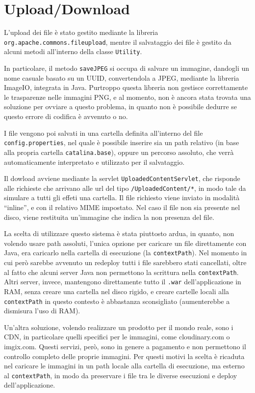 \chapter{Upload/Download}

L'upload dei file è stato gestito mediante la libreria \texttt{org.apache.commons.fileupload}, mentre il salvataggio dei file è gestito da alcuni metodi all'interno della classe \texttt{Utility}.

In particolare, il metodo \texttt{saveJPEG} si occupa di salvare un immagine, dandogli un nome casuale basato su un UUID, convertendola a JPEG, mediante la libreria ImageIO, integrata in Java.
Purtroppo questa libreria non gestisce correttamente le trasparenze nelle immagini PNG, e al momento, non è ancora stata trovata una soluzione per ovviare a questo problema, in quanto non è possibile dedurre se questo errore di codifica è avvenuto o no.

I file vengono poi salvati in una cartella definita all'interno del file \texttt{config.properties}, nel quale è possibile inserire sia un path relativo (in base alla propria cartella \texttt{catalina.base}), oppure un percorso assoluto, che verrà automaticamente interpretato e utilizzato per il salvataggio.

Il dowload avviene mediante la servlet \texttt{UploadedContentServlet}, che risponde alle richieste che arrivano alle url del tipo \texttt{/UploadedContent/*}, in modo tale da simulare a tutti gli effeti una cartella. Il file richiesto viene inviato in modalità ``inline'', e con il relativo MIME impostato. Nel caso il file non sia presente nel disco, viene restituita un'immagine che indica la non presenza del file.

La scelta di utilizzare questo sistema è stata piuttosto ardua, in quanto, non volendo usare path assoluti, l'unica opzione per caricare un file direttamente con Java, era caricarlo nella cartella di esecuzione (la \texttt{contextPath}). Nel momento in cui però sarebbe avvenuto un redeploy tutti i file sarebbero stati cancellati, oltre al fatto che alcuni server Java non permettono la scrittura nella \texttt{contextPath}. Altri server, invece, mantengono direttamente tutto il \texttt{.war} dell'applicazione in RAM, senza creare una cartella nel disco rigido, e creare cartelle locali alla \texttt{contextPath} in questo contesto è abbastanza sconsigliato (aumenterebbe a dismisura l'uso di RAM).

Un'altra soluzione, volendo realizzare un prodotto per il mondo reale, sono i CDN, in particolare quelli specifici per le immagini, come cloudinary.com o imgix.com. Questi servizi, però, sono in genere a pagamento e non permettono il controllo completo delle proprie immagini. Per questi motivi la scelta è ricaduta nel caricare le immagini in un path locale alla cartella di esecuzione, ma esterno al \texttt{contextPath}, in modo da preservare i file tra le diverse esecuzioni e deploy dell'applicazione.

